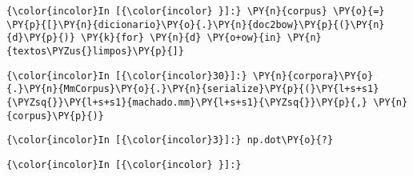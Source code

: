 \begin{Verbatim}[commandchars=\\\{\}]
    \end{Verbatim}

    \begin{Verbatim}[commandchars=\\\{\}]
{\color{incolor}In [{\color{incolor} }]:} \PY{n}{corpus} \PY{o}{=} \PY{p}{[}\PY{n}{dicionario}\PY{o}{.}\PY{n}{doc2bow}\PY{p}{(}\PY{n}{d}\PY{p}{)} \PY{k}{for} \PY{n}{d} \PY{o+ow}{in} \PY{n}{textos\PYZus{}limpos}\PY{p}{]}
\end{Verbatim}

    \begin{Verbatim}[commandchars=\\\{\}]
{\color{incolor}In [{\color{incolor}30}]:} \PY{n}{corpora}\PY{o}{.}\PY{n}{MmCorpus}\PY{o}{.}\PY{n}{serialize}\PY{p}{(}\PY{l+s+s1}{\PYZsq{}}\PY{l+s+s1}{machado.mm}\PY{l+s+s1}{\PYZsq{}}\PY{p}{,} \PY{n}{corpus}\PY{p}{)}
\end{Verbatim}

    \begin{Verbatim}[commandchars=\\\{\}]
{\color{incolor}In [{\color{incolor}3}]:} np.dot\PY{o}{?}
\end{Verbatim}

    \begin{Verbatim}[commandchars=\\\{\}]
{\color{incolor}In [{\color{incolor} }]:} 
\end{Verbatim}


    
    
    
    